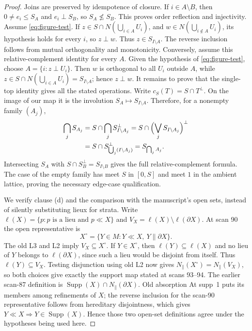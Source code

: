 \begin{proof}
Joins are preserved by idempotence of closure. If $i\in A\setminus B$,
then $0\ne e_i\leq S_A$ and $e_i\perp S_B$, so $S_A\not\leq S_B$.
This proves order reflection and injectivity.
Assume \eqref{eq:figure-test}. If
$z\in S\cap N(\bigcup_{i\in A}U_i)$, and
$w\in N(\bigcup_{i\notin A}U_i)$, its hypothesis holds for every
$i$, so $z\perp w$. Thus $z\in S_{I\setminus A}$. The reverse
inclusion follows from mutual orthogonality and monotonicity.
Conversely, assume this relative-complement identity for every $A$.
Given the hypothesis of \eqref{eq:figure-test}, choose
$A=\{i:z\perp U_i\}$. Then $w$ is orthogonal to all $U_i$ outside
$A$, while $z\in S\cap N(\bigcup_{i\in A}U_i)=S_{I\setminus A}$;
hence $z\perp w$.
It remains to prove that the single-top identity gives all the stated
operations. Write $c_S(T)=S\cap T^\perp$. On the image of our map it
is the involution $S_A\mapsto S_{I\setminus A}$. Therefore, for a
nonempty family $(A_j)$,
\[
\begin{split}
 \bigcap_j S_{A_j}
 &=S\cap\bigcap_j S_{I\setminus A_j}^{\perp}
 =S\cap\Bigl(\bigvee_j S_{I\setminus A_j}\Bigr)^\perp\\
 &=S\cap S_{\bigcup_j(I\setminus A_j)}^\perp
 =S_{\bigcap_j A_j}.
\end{split}
\]
Intersecting $S_A$ with $S\cap S_B^\perp=S_{I\setminus B}$ gives
the full relative-complement formula. The case of the empty family
has meet $S$ in $[0,S]$ and meet $1$ in the ambient lattice, proving
the necessary edge-case qualification.

We verify clause (d) and the comparison with the manuscript's open
sets, instead of silently substituting lieux for strata. Write
$\ell(X)=\{p:p\text{ is a lieu and }p\ll X\}$ and
$V_X=\ell(X)\setminus\ell(\partial X)$. At scan 90 the open
representative is
\[
 X^\circ=\{Y\in M:Y\ll X,\ Y\parallel\partial X\}.
\]
The old L3 and L2 imply $V_X\subseteq X^\circ$. If
$Y\in X^\circ$, then $\ell(Y)\subseteq\ell(X)$ and no lieu
of $Y$ belongs to $\ell(\partial X)$, since such a lieu would
be disjoint from itself. Thus $\ell(Y)\subseteq V_X$.
Testing disjunction using old L2 now gives
$N_\parallel(X^\circ)=N_\parallel(V_X)$, so both choices give
exactly the support map stated at scans 93--94.
The earlier scan-87 definition is
$\operatorname{Supp}(X)\cap N_\parallel(\partial X)$.
Old absorption At supp~1 puts its members among refinements of $X$;
the reverse inclusion for the scan-90 representative follows from
hereditary disjointness, which gives
$Y\ll X\Rightarrow Y\in\operatorname{Supp}(X)$.
Hence those two open-set definitions agree under the hypotheses
being used here.


\end{proof}
